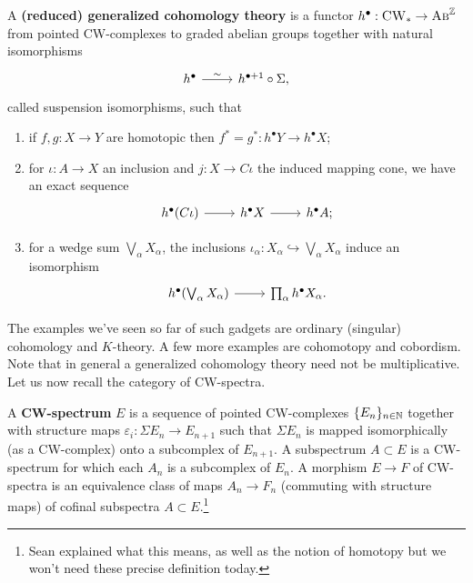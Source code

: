\documentclass{amsart}
\begin{document}
\begin{definition}
    A \textbf{(reduced) generalized cohomology theory} is a functor $h^\bullet:\textsc{CW}_*\to\textsc{Ab}^{\mathbb{Z}}$ from
    pointed CW-complexes to graded abelian groups together with natural isomorphisms
    \begin{equation*}
        \begin{tikzcd}
            h^\bullet\rar{\sim}& h^{\bullet+1}\circ\Sigma,
        \end{tikzcd}
    \end{equation*}
    called suspension isomorphisms, such that
    \begin{enumerate}
        \item if $f,g:X\to Y$ are homotopic then $f^*=g^*:h^\bullet Y\to h^\bullet X$;
        \item for $\iota:A\to X$ an inclusion and $j:X\to C\iota$ the induced mapping cone, we have an exact sequence
            \begin{equation*}
                \begin{tikzcd}
                    h^\bullet(C\iota)\rar & h^\bullet X\rar & h^\bullet A;
                \end{tikzcd}
            \end{equation*}
        \item for a wedge sum $\bigvee_\alpha X_\alpha$, the inclusions $\iota_\alpha:X_\alpha\hookrightarrow\bigvee_\alpha X_\alpha$
            induce an isomorphism
            \begin{equation*}
                \begin{tikzcd}
                    h^\bullet(\bigvee_\alpha X_\alpha)\rar & \prod_\alpha h^\bullet X_\alpha.
                \end{tikzcd}
            \end{equation*}
    \end{enumerate}
\end{definition}

The examples we've seen so far of such gadgets are ordinary (singular) cohomology and $K$-theory. A few more
examples are cohomotopy and cobordism. Note that in general a generalized cohomology theory need not be multiplicative.
Let us now recall the category of CW-spectra.

\begin{definition}
    A \textbf{CW-spectrum} $E$ is a sequence of pointed CW-complexes $\{E_n\}_{n\in\mathbb{N}}$ together with structure
    maps $\varepsilon_i:\Sigma E_n\to E_{n+1}$ such that $\Sigma E_n$ is mapped isomorphically (as a CW-complex)
    onto a subcomplex of $E_{n+1}$. A subspectrum $A\subset E$ is a CW-spectrum for which each $A_n$ is a subcomplex
    of $E_n$. A morphism $E\to F$ of CW-spectra is an equivalence class of maps $A_n\to F_n$ (commuting with structure
    maps) of cofinal subspectra $A\subset E$.\footnote{Sean explained what this means, as well as the notion of homotopy
        but we won't need these precise definition today.}
\end{definition}
\end{document}
